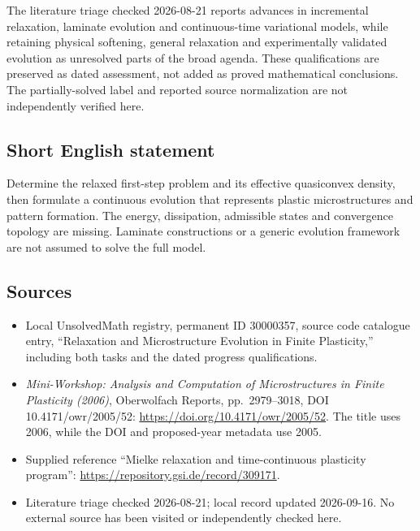 \documentclass[11pt]{article}
\begin{document}
The literature triage checked 2026-08-21 reports advances in incremental relaxation, laminate evolution and continuous-time variational models, while retaining physical softening, general relaxation and experimentally validated evolution as unresolved parts of the broad agenda. These qualifications are preserved as dated assessment, not added as proved mathematical conclusions. The partially-solved label and reported source normalization are not independently verified here.
\subsection{Short English statement}
Determine the relaxed first-step problem and its effective quasiconvex density, then formulate a continuous evolution that represents plastic microstructures and pattern formation. The energy, dissipation, admissible states and convergence topology are missing. Laminate constructions or a generic evolution framework are not assumed to solve the full model.
\subsection{Sources}
\begin{itemize}
\item Local UnsolvedMath registry, permanent ID 30000357, source code catalogue entry, ``Relaxation and Microstructure Evolution in Finite Plasticity,'' including both tasks and the dated progress qualifications.
\item \emph{Mini-Workshop: Analysis and Computation of Microstructures in Finite Plasticity (2006)}, Oberwolfach Reports, pp.\ 2979--3018, DOI 10.4171/owr/2005/52: \url{https://doi.org/10.4171/owr/2005/52}. The title uses 2006, while the DOI and proposed-year metadata use 2005.
\item Supplied reference ``Mielke relaxation and time-continuous plasticity program'': \url{https://repository.gsi.de/record/309171}.
\item Literature triage checked 2026-08-21; local record updated 2026-09-16. No external source has been visited or independently checked here.
\end{itemize}
\end{document}
